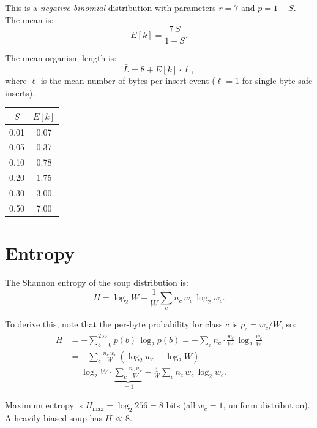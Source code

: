 \documentclass{article}
\begin{document}
This is a \emph{negative binomial} distribution with parameters
$r = 7$ and $p = 1 - S$.  The mean is:
\begin{equation}
\boxed{
E[k] = \frac{7\,S}{1 - S}.
}
\label{eq:ek}
\end{equation}

The mean organism length is:
\begin{equation}
\bar{L} = 8 + E[k] \cdot \ell,
\label{eq:Lbar}
\end{equation}
where $\ell$ is the mean number of bytes per insert event
($\ell = 1$ for single-byte safe inserts).

\begin{center}
\begin{tabular}{@{}cc@{}}
\toprule
$S$ & $E[k]$ \\
\midrule
0.01 & 0.07 \\
0.05 & 0.37 \\
0.10 & 0.78 \\
0.20 & 1.75 \\
0.30 & 3.00 \\
0.50 & 7.00 \\
\bottomrule
\end{tabular}
\end{center}

\section{Entropy}
\label{sec:entropy}

The Shannon entropy of the soup distribution is:
\begin{equation}
\boxed{
H = \log_2 W - \frac{1}{W}\sum_c n_c\,w_c\,\log_2 w_c.
}
\label{eq:entropy}
\end{equation}

To derive this, note that the per-byte probability for class $c$
is $p_c = w_c/W$, so:
\begin{align}
H &= -\sum_{b=0}^{255} p(b)\,\log_2 p(b)
   = -\sum_c n_c \cdot \frac{w_c}{W}\,\log_2\!\frac{w_c}{W}
  \nonumber \\
  &= -\sum_c \frac{n_c\,w_c}{W}\,(\log_2 w_c - \log_2 W)
  \nonumber \\
  &= \log_2 W \cdot \underbrace{\sum_c \frac{n_c\,w_c}{W}}_{=1}
     - \frac{1}{W}\sum_c n_c\,w_c\,\log_2 w_c.
\label{eq:entropy_deriv}
\end{align}

Maximum entropy is $H_{\max} = \log_2 256 = 8$ bits (all $w_c = 1$,
uniform distribution).  A heavily biased soup has $H \ll 8$.
\end{document}
